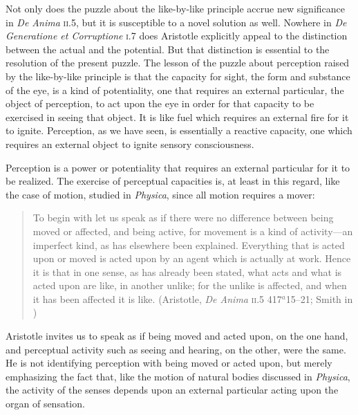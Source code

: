 Not only does the puzzle about the like-by-like principle accrue new significance in \emph{De Anima} \textsc{ii}.5, but it is susceptible to a novel solution as well. Nowhere in \emph{De Generatione et Corruptione} \textsc{i}.7 does Aristotle explicitly appeal to the distinction between the actual and the potential. But that distinction is essential to the resolution of the present puzzle. The lesson of the puzzle about perception raised by the like-by-like principle is that the capacity for sight, the form and substance of the eye, is a kind of potentiality, one that requires an external particular, the object of perception, to act upon the eye in order for that capacity to be exercised in seeing that object. It is like fuel which requires an external fire for it to ignite. Perception, as we have seen, is essentially a reactive capacity, one which requires an external object to ignite sensory consciousness.

Perception is a power or potentiality that requires an external particular for it to be realized. The exercise of perceptual capacities is, at least in this regard, like the case of motion, studied in \emph{Physica}, since all motion requires a mover:
\begin{quote}
	To begin with let us speak as if there were no difference between being moved or affected, and being active, for movement is a kind of activity---an imperfect kind, as has elsewhere been explained. Everything that is acted upon or moved is acted upon by an agent which is actually at work. Hence it is that in one sense, as has already been stated, what acts and what is acted upon are like, in another unlike; for the unlike is affected, and when it has been affected it is like. (Aristotle, \emph{De Anima} \textsc{ii}.5 417\( ^{a} \)15--21; Smith in \citealt[30]{Barnes:1984uq})
\end{quote}
Aristotle invites us to speak as if being moved and acted upon, on the one hand, and perceptual activity such as seeing and hearing, on the other, were the same. He is not identifying perception with being moved or acted upon, but merely emphasizing the fact that, like the motion of natural bodies discussed in \emph{Physica}, the activity of the senses depends upon an external particular acting upon the organ of sensation.

